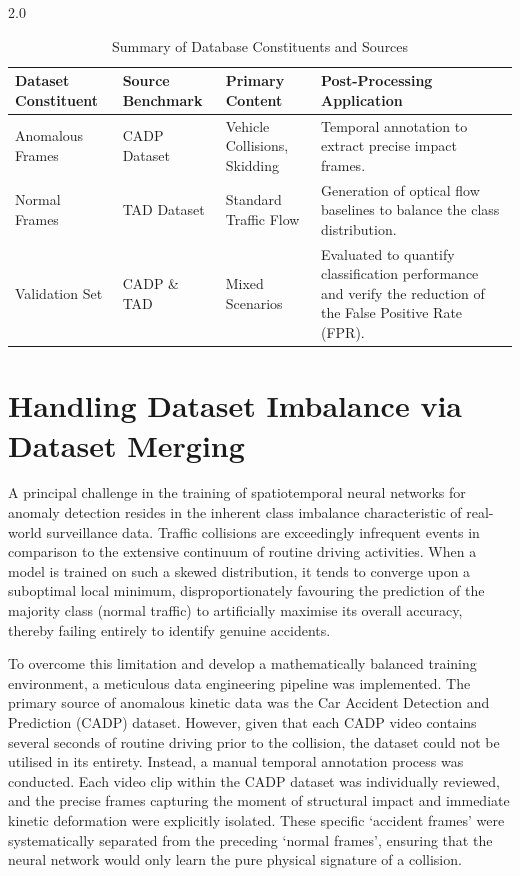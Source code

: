\begin{spacing}{2.0}
\begin{table}[H]
    \centering
    \begin{tabular}{p{3cm} p{3cm} p{4cm} p{4cm}}
        \toprule
        \textbf{Dataset Constituent} & \textbf{Source Benchmark} & \textbf{Primary Content} & \textbf{Post-Processing Application} \\
        \midrule
        Anomalous Frames & CADP Dataset & Vehicle Collisions, Skidding & Temporal annotation to extract precise impact frames. \\
        Normal Frames & TAD Dataset & Standard Traffic Flow & Generation of optical flow baselines to balance the class distribution. \\
        Validation Set & CADP \& TAD & Mixed Scenarios & Evaluated to quantify classification performance and verify the reduction of the False Positive Rate (FPR). \\
        \bottomrule
    \end{tabular}
    \caption{Summary of Database Constituents and Sources}
    \label{tab:database_sources}
\end{table}

\section{Handling Dataset Imbalance via Dataset Merging}
A principal challenge in the training of spatiotemporal neural networks for anomaly detection resides in the inherent class imbalance characteristic of real-world surveillance data. Traffic collisions are exceedingly infrequent events in comparison to the extensive continuum of routine driving activities. When a model is trained on such a skewed distribution, it tends to converge upon a suboptimal local minimum, disproportionately favouring the prediction of the majority class (normal traffic) to artificially maximise its overall accuracy, thereby failing entirely to identify genuine accidents.

To overcome this limitation and develop a mathematically balanced training environment, a meticulous data engineering pipeline was implemented. The primary source of anomalous kinetic data was the Car Accident Detection and Prediction (CADP) dataset. However, given that each CADP video contains several seconds of routine driving prior to the collision, the dataset could not be utilised in its entirety. Instead, a manual temporal annotation process was conducted. Each video clip within the CADP dataset was individually reviewed, and the precise frames capturing the moment of structural impact and immediate kinetic deformation were explicitly isolated. These specific ‘accident frames’ were systematically separated from the preceding ‘normal frames’, ensuring that the neural network would only learn the pure physical signature of a collision.


\end{spacing}
